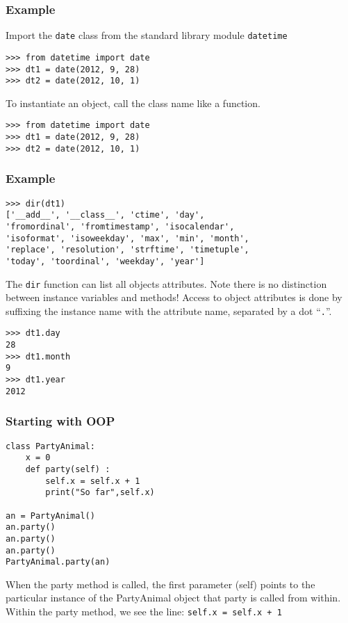 \begin{frame}[fragile]\frametitle{Example}
Import the \lstinline{date} class from the standard library module \lstinline{datetime}
\begin{lstlisting}
>>> from datetime import date
>>> dt1 = date(2012, 9, 28)
>>> dt2 = date(2012, 10, 1)
\end{lstlisting}
To instantiate an object, call the class name like a function.
\begin{lstlisting}
>>> from datetime import date
>>> dt1 = date(2012, 9, 28)
>>> dt2 = date(2012, 10, 1)
\end{lstlisting}
\end{frame}

\begin{frame}[fragile] \frametitle{Example}
\begin{lstlisting}
>>> dir(dt1)
['__add__', '__class__', 'ctime', 'day',
'fromordinal', 'fromtimestamp', 'isocalendar',
'isoformat', 'isoweekday', 'max', 'min', 'month',
'replace', 'resolution', 'strftime', 'timetuple',
'today', 'toordinal', 'weekday', 'year']
\end{lstlisting}
The \lstinline{dir} function can list all objects attributes. Note there is no distinction between instance variables and methods! Access to object attributes is done by suffixing the instance name with the attribute name, separated by a dot ``\lstinline{.}''.
\begin{lstlisting}
>>> dt1.day
28
>>> dt1.month
9
>>> dt1.year
2012
\end{lstlisting}
\end{frame}

\begin{frame}[fragile]\frametitle{Starting with OOP}
\begin{lstlisting}
class PartyAnimal:
	x = 0
	def party(self) :
		self.x = self.x + 1
		print("So far",self.x)

an = PartyAnimal()
an.party()
an.party()
an.party()
PartyAnimal.party(an)
\end{lstlisting}
When the party method is called, the first parameter (self) points to the particular instance of the PartyAnimal object that party is called from within. 
Within the party method, we see the line:
\lstinline|self.x = self.x + 1|
\end{frame}

